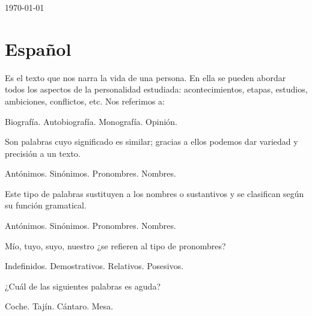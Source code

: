 \documentclass[12pt]{exam}
\begin{document}
\begin{center}
\today
\end{center}

\section{Español}
\begin{questions}
    \question Es el texto  que nos narra la vida de una persona. En ella se pueden abordar todos los aspectos de la personalidad estudiada: acontecimientos, etapas, estudios, ambiciones, conflictos, etc. Nos referimos a:
    \\[1em]
    \begin{oneparchoices}
        \choice Biografía.
        \choice Autobiografía.
        \choice Monografía.
        \choice Opinión.
    \end{oneparchoices}

    \question Son palabras cuyo significado es similar; gracias a ellos podemos dar variedad y precisión a un texto.
    \\[1em]
    \begin{oneparchoices}
        \choice Antónimos.
        \choice Sinónimos.
        \choice Pronombres.
        \choice Nombres.
    \end{oneparchoices}

    \question Este tipo de palabras sustituyen a los nombres o sustantivos y se clasifican según su función gramatical.
    \\[1em]
    \begin{oneparchoices}
        \choice Antónimos.
        \choice Sinónimos.
        \choice Pronombres.
        \choice Nombres.
    \end{oneparchoices}

    \question Mío, tuyo, suyo, nuestro ¿se refieren al tipo de pronombres?
    \\[1em]
    \begin{oneparchoices}
        \choice Indefinidos.
        \choice Demostrativos.
        \choice Relativos.
        \choice Posesivos.
    \end{oneparchoices}

    \question ¿Cuál de las siguientes palabras es aguda?
    \\[1em]
    \begin{oneparchoices}
        \choice Coche.
        \choice Tajín.
        \choice Cántaro.
        \choice Mesa.
    \end{oneparchoices}


\end{questions}
\end{document}
